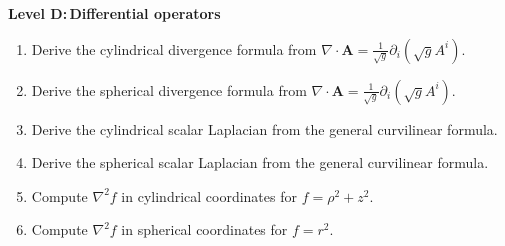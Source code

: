 \documentclass{otscience}
\begin{document}
\begin{practicebox}
    \textbf{Level D:\,Differential operators}
    \begin{enumerate}
        \item Derive the cylindrical divergence formula from \(\nabla\cdot\mathbf{A}=\frac1{\sqrt g}\partial_i(\sqrt g A^i)\).
        \item Derive the spherical divergence formula from \(\nabla\cdot\mathbf{A}=\frac1{\sqrt g}\partial_i(\sqrt g A^i)\).
        \item Derive the cylindrical scalar Laplacian from the general curvilinear formula.
        \item Derive the spherical scalar Laplacian from the general curvilinear formula.
        \item Compute \(\nabla^2f\) in cylindrical coordinates for \(f=\rho^2+z^2\).
        \item Compute \(\nabla^2f\) in spherical coordinates for \(f=r^2\).
    \end{enumerate}
\end{practicebox}

\ifdefined\OTCOMBINED%
\else
\end{document}
